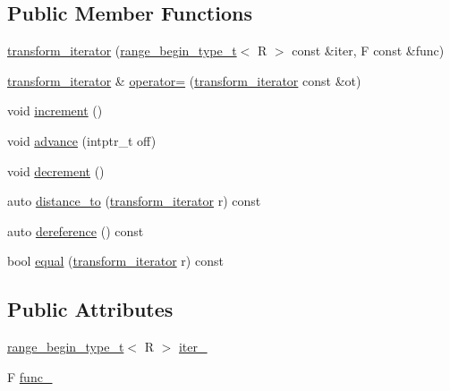 \subsection*{Public Member Functions}
\begin{DoxyCompactItemize}
\item 
\mbox{\hyperlink{struct_r_a_h___n_a_m_e_s_p_a_c_e_1_1view_1_1transform__iterator_ac734c82ed270bf0323dd7f7361de9b2b}{transform\+\_\+iterator}} (\mbox{\hyperlink{namespace_r_a_h___n_a_m_e_s_p_a_c_e_a46705781d6869d5151141f871ced1e9c}{range\+\_\+begin\+\_\+type\+\_\+t}}$<$ R $>$ const \&iter, F const \&func)
\item 
\mbox{\hyperlink{struct_r_a_h___n_a_m_e_s_p_a_c_e_1_1view_1_1transform__iterator}{transform\+\_\+iterator}} \& \mbox{\hyperlink{struct_r_a_h___n_a_m_e_s_p_a_c_e_1_1view_1_1transform__iterator_ae4aafe9c80f18c04166df44cfc7c9951}{operator=}} (\mbox{\hyperlink{struct_r_a_h___n_a_m_e_s_p_a_c_e_1_1view_1_1transform__iterator}{transform\+\_\+iterator}} const \&ot)
\item 
void \mbox{\hyperlink{struct_r_a_h___n_a_m_e_s_p_a_c_e_1_1view_1_1transform__iterator_a314c8d51a27d0d39f0a810e6fb7c1fc1}{increment}} ()
\item 
void \mbox{\hyperlink{struct_r_a_h___n_a_m_e_s_p_a_c_e_1_1view_1_1transform__iterator_ae868c91f78e921f3ff63cf7c23ebc77e}{advance}} (intptr\+\_\+t off)
\item 
void \mbox{\hyperlink{struct_r_a_h___n_a_m_e_s_p_a_c_e_1_1view_1_1transform__iterator_a99b8d1749560539e4b1c2d7cda4074c0}{decrement}} ()
\item 
auto \mbox{\hyperlink{struct_r_a_h___n_a_m_e_s_p_a_c_e_1_1view_1_1transform__iterator_abb46d19168d30284cd232094a219f432}{distance\+\_\+to}} (\mbox{\hyperlink{struct_r_a_h___n_a_m_e_s_p_a_c_e_1_1view_1_1transform__iterator}{transform\+\_\+iterator}} r) const
\item 
auto \mbox{\hyperlink{struct_r_a_h___n_a_m_e_s_p_a_c_e_1_1view_1_1transform__iterator_a74509747cb7b599f23f0d169450b344f}{dereference}} () const
\item 
bool \mbox{\hyperlink{struct_r_a_h___n_a_m_e_s_p_a_c_e_1_1view_1_1transform__iterator_a7f9d61a4a68fa70f51253066c7fe9321}{equal}} (\mbox{\hyperlink{struct_r_a_h___n_a_m_e_s_p_a_c_e_1_1view_1_1transform__iterator}{transform\+\_\+iterator}} r) const
\end{DoxyCompactItemize}
\subsection*{Public Attributes}
\begin{DoxyCompactItemize}
\item 
\mbox{\hyperlink{namespace_r_a_h___n_a_m_e_s_p_a_c_e_a46705781d6869d5151141f871ced1e9c}{range\+\_\+begin\+\_\+type\+\_\+t}}$<$ R $>$ \mbox{\hyperlink{struct_r_a_h___n_a_m_e_s_p_a_c_e_1_1view_1_1transform__iterator_a93cb5f63a7eb446bd2275ea21a00519d}{iter\+\_\+}}
\item 
F \mbox{\hyperlink{struct_r_a_h___n_a_m_e_s_p_a_c_e_1_1view_1_1transform__iterator_a710e156dfc00b745237dd3b725fb6c43}{func\+\_\+}}
\end{DoxyCompactItemize}


